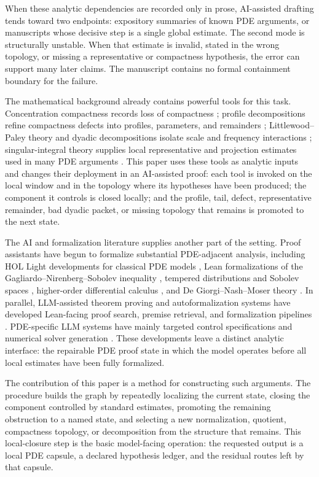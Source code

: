 \documentclass[11pt]{article}
\theoremstyle{plain}
\theoremstyle{definition}
\theoremstyle{remark}
\begin{document}
When these analytic dependencies are recorded only in prose, AI-assisted
drafting tends toward two endpoints: expository summaries of known PDE
arguments, or manuscripts whose decisive step is a single global estimate.  The
second mode is structurally unstable.  When that estimate is invalid, stated in
the wrong topology, or missing a representative or compactness hypothesis, the
error can support many later claims.  The manuscript contains no formal
containment boundary for the failure.

The mathematical background already contains powerful tools for this task.
Concentration compactness records loss of compactness
\cite{Lions1984a,Lions1984b}; profile decompositions refine compactness
defects into profiles, parameters, and remainders
\cite{Gerard1998,BahouriGerard1999,Keraani2001}; Littlewood--Paley theory and
dyadic decompositions isolate scale and frequency interactions
\cite{Stein1993,BahouriCheminDanchin2011}; singular-integral theory supplies
local representative and projection estimates used in many PDE arguments
\cite{CalderonZygmund1952}.  This paper uses these tools as analytic inputs
and changes their deployment in an AI-assisted proof: each tool is invoked on
the local window and in the topology where its hypotheses have been produced;
the component it controls is closed locally; and the profile, tail, defect,
representative remainder, bad dyadic packet, or missing topology that remains is
promoted to the next state.

The AI and formalization literature supplies another part of the setting.
Proof assistants have begun to formalize substantial PDE-adjacent analysis,
including HOL Light developments for classical PDE models
\cite{Deniz2024}, Lean formalizations of the Gagliardo--Nirenberg--Sobolev
inequality \cite{VanDoornMacbeth2024}, tempered distributions and Sobolev
spaces \cite{Doll2025}, higher-order differential calculus
\cite{Gouezel2025}, and De Giorgi--Nash--Moser theory
\cite{ArmstrongKempe2026}.  In parallel, LLM-assisted theorem proving and
autoformalization systems have developed Lean-facing proof search, premise
retrieval, and formalization pipelines
\cite{LeanDojo2023,LeanCopilot2024,CRAMF2025}.  PDE-specific LLM systems have
mainly targeted control specifications and numerical solver generation
\cite{PDEController2025,CodePDE2025}.  These developments leave a distinct
analytic interface: the repairable PDE proof state in which the model operates
before all local estimates have been fully formalized.

The contribution of this paper is a method for constructing such arguments.
The procedure builds the graph by repeatedly localizing the current state,
closing the component controlled by standard estimates, promoting the
remaining obstruction to a named state, and selecting a new normalization,
quotient, compactness topology, or decomposition from the structure that
remains.  This local-closure step is the basic model-facing operation: the
requested output is a local PDE capsule, a declared hypothesis ledger, and the
residual routes left by that capsule.
\end{document}
